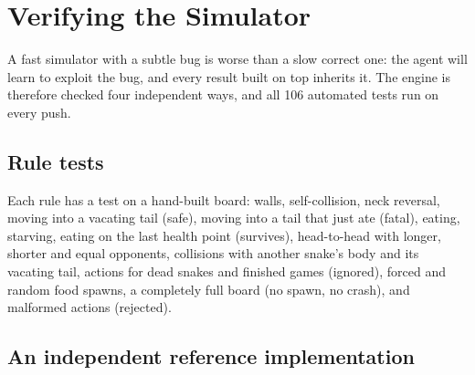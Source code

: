 \chapter{Verifying the Simulator}\label{ch:verify}

A fast simulator with a subtle bug is worse than a slow correct one: the agent will
learn to exploit the bug, and every result built on top inherits it. The engine is
therefore checked four independent ways, and all 106 automated tests run on every push.

\begin{center}
\end{center}

\section{Rule tests}

Each rule has a test on a hand-built board: walls, self-collision, neck reversal, moving
into a vacating tail (safe), moving into a tail that just ate (fatal), eating, starving,
eating on the last health point (survives), head-to-head with longer, shorter and equal
opponents, collisions with another snake's body and its vacating tail, actions for dead
snakes and finished games (ignored), forced and random food spawns, a completely full
board (no spawn, no crash), and malformed actions (rejected).

\section{An independent reference implementation}

